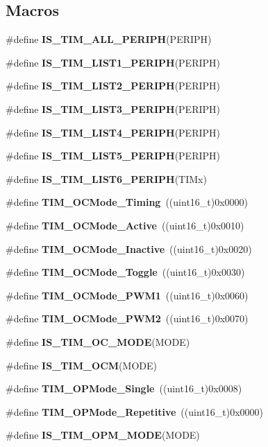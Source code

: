 \subsection*{Macros}
\begin{DoxyCompactItemize}
\item 
\#define \textbf{ I\+S\+\_\+\+T\+I\+M\+\_\+\+A\+L\+L\+\_\+\+P\+E\+R\+I\+PH}(P\+E\+R\+I\+PH)
\item 
\#define \textbf{ I\+S\+\_\+\+T\+I\+M\+\_\+\+L\+I\+S\+T1\+\_\+\+P\+E\+R\+I\+PH}(P\+E\+R\+I\+PH)
\item 
\#define \textbf{ I\+S\+\_\+\+T\+I\+M\+\_\+\+L\+I\+S\+T2\+\_\+\+P\+E\+R\+I\+PH}(P\+E\+R\+I\+PH)
\item 
\#define \textbf{ I\+S\+\_\+\+T\+I\+M\+\_\+\+L\+I\+S\+T3\+\_\+\+P\+E\+R\+I\+PH}(P\+E\+R\+I\+PH)
\item 
\#define \textbf{ I\+S\+\_\+\+T\+I\+M\+\_\+\+L\+I\+S\+T4\+\_\+\+P\+E\+R\+I\+PH}(P\+E\+R\+I\+PH)
\item 
\#define \textbf{ I\+S\+\_\+\+T\+I\+M\+\_\+\+L\+I\+S\+T5\+\_\+\+P\+E\+R\+I\+PH}(P\+E\+R\+I\+PH)
\item 
\#define \textbf{ I\+S\+\_\+\+T\+I\+M\+\_\+\+L\+I\+S\+T6\+\_\+\+P\+E\+R\+I\+PH}(T\+I\+Mx)
\item 
\#define \textbf{ T\+I\+M\+\_\+\+O\+C\+Mode\+\_\+\+Timing}~((uint16\+\_\+t)0x0000)
\item 
\#define \textbf{ T\+I\+M\+\_\+\+O\+C\+Mode\+\_\+\+Active}~((uint16\+\_\+t)0x0010)
\item 
\#define \textbf{ T\+I\+M\+\_\+\+O\+C\+Mode\+\_\+\+Inactive}~((uint16\+\_\+t)0x0020)
\item 
\#define \textbf{ T\+I\+M\+\_\+\+O\+C\+Mode\+\_\+\+Toggle}~((uint16\+\_\+t)0x0030)
\item 
\#define \textbf{ T\+I\+M\+\_\+\+O\+C\+Mode\+\_\+\+P\+W\+M1}~((uint16\+\_\+t)0x0060)
\item 
\#define \textbf{ T\+I\+M\+\_\+\+O\+C\+Mode\+\_\+\+P\+W\+M2}~((uint16\+\_\+t)0x0070)
\item 
\#define \textbf{ I\+S\+\_\+\+T\+I\+M\+\_\+\+O\+C\+\_\+\+M\+O\+DE}(M\+O\+DE)
\item 
\#define \textbf{ I\+S\+\_\+\+T\+I\+M\+\_\+\+O\+CM}(M\+O\+DE)
\item 
\#define \textbf{ T\+I\+M\+\_\+\+O\+P\+Mode\+\_\+\+Single}~((uint16\+\_\+t)0x0008)
\item 
\#define \textbf{ T\+I\+M\+\_\+\+O\+P\+Mode\+\_\+\+Repetitive}~((uint16\+\_\+t)0x0000)
\item 
\#define \textbf{ I\+S\+\_\+\+T\+I\+M\+\_\+\+O\+P\+M\+\_\+\+M\+O\+DE}(M\+O\+DE)

\end{DoxyCompactItemize}
